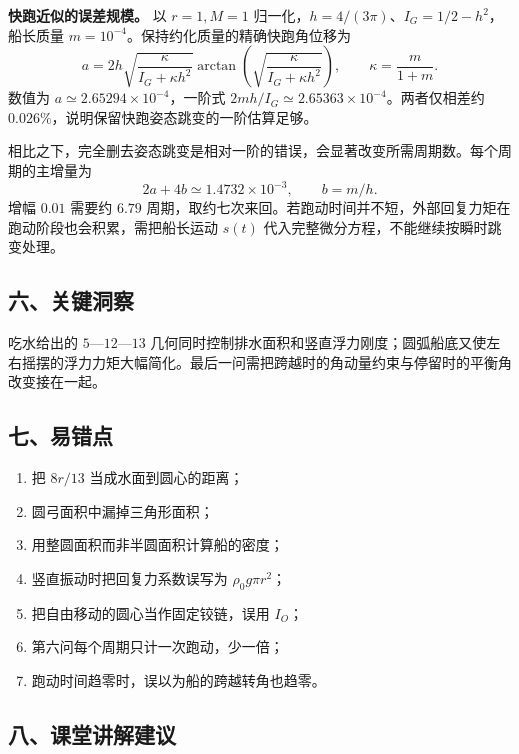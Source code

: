 \documentclass[12pt,a4paper,UTF8]{ctexart}
\newcommand{\tightlist}{\setlength{\itemsep}{0pt}\setlength{\parskip}{0pt}}
\begin{document}
\textbf{快跑近似的误差规模。} 以 \(r=1,M=1\)
归一化，\(h=4/(3\pi)\)、\(I_G=1/2-h^2\)，船长质量
\(m=10^{-4}\)。保持约化质量的精确快跑角位移为 \[
a=2h\sqrt{\frac{\kappa}{I_G+\kappa h^2}}
\arctan\left(\sqrt{\frac\kappa{I_G+\kappa h^2}}\right),
\qquad \kappa=\frac{m}{1+m}.
\] 数值为 \(a\simeq2.65294\times10^{-4}\)，一阶式
\(2mh/I_G\simeq2.65363\times10^{-4}\)。两者仅相差约
\(0.026\%\)，说明保留快跑姿态跳变的一阶估算足够。

相比之下，完全删去姿态跳变是相对一阶的错误，会显著改变所需周期数。每个周期的主增量为
\[
2a+4b\simeq1.4732\times10^{-3},
\qquad b=m/h.
\] 增幅 \(0.01\) 需要约 \(6.79\)
周期，取约七次来回。若跑动时间并不短，外部回复力矩在跑动阶段也会积累，需把船长运动
\(s(t)\) 代入完整微分方程，不能继续按瞬时跳变处理。

\subsection{六、关键洞察}\label{ux516dux5173ux952eux6d1eux5bdf-1}

吃水给出的 \(5\)---\(12\)---\(13\)
几何同时控制排水面积和竖直浮力刚度；圆弧船底又使左右摇摆的浮力力矩大幅简化。最后一问需把跨越时的角动量约束与停留时的平衡角改变接在一起。

\subsection{七、易错点}\label{ux4e03ux6613ux9519ux70b9-1}

\begin{enumerate}
\def\labelenumi{\arabic{enumi}.}
\tightlist
\item
  把 \(8r/13\) 当成水面到圆心的距离；
\item
  圆弓面积中漏掉三角形面积；
\item
  用整圆面积而非半圆面积计算船的密度；
\item
  竖直振动时把回复力系数误写为 \(\rho_0g\pi r^2\)；
\item
  把自由移动的圆心当作固定铰链，误用 \(I_O\)；
\item
  第六问每个周期只计一次跑动，少一倍；
\item
  跑动时间趋零时，误以为船的跨越转角也趋零。
\end{enumerate}

\subsection{八、课堂讲解建议}\label{ux516bux8bfeux5802ux8bb2ux89e3ux5efaux8bae-1}
\end{document}
